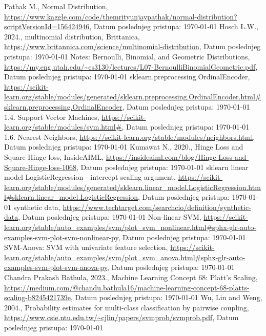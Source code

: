 \documentclass[fontsize=12bp, paper=a4]{scrarticle}
\begin{document}
\begin{thebibliography}{1}
    Pathak M., Normal Distribution, \url{https://www.kaggle.com/code/themrityunjaypathak/normal-distribution?scriptVersionId=156424946}, Datum poslednjeg pristupa: \today
    Hosch L.W., 2024., multinomial distribution, Brittanica, \url{https://www.britannica.com/science/multinomial-distribution}, Datum poslednjeg pristupa: \today
    Notes: Bernoulli, Binomial, and Geometric Distributions, \url{https://my.eng.utah.edu/~cs3130/lectures/L07-BernoulliBinomialGeometric.pdf}, Datum poslednjeg pristupa: \today
    sklearn.preprocessing.OrdinalEncoder, \url{https://scikit-learn.org/stable/modules/generated/sklearn.preprocessing.OrdinalEncoder.html#sklearn.preprocessing.OrdinalEncoder}, Datum poslednjeg pristupa: \today
    1.4. Support Vector Machines, \url{https://scikit-learn.org/stable/modules/svm.html#}, Datum poslednjeg pristupa: \today
    1.6. Nearest Neighbors, \url{https://scikit-learn.org/stable/modules/neighbors.html}, Datum poslednjeg pristupa: \today
    Kumawat N., 2020., Hinge Loss and Square Hinge loss,  InsideAIML, \url{https://insideaiml.com/blog/Hinge-Loss-and-Square-Hinge-loss-1068}, Datum poslednjeg pristupa: \today
    \textmd{sklearn linear model LogisticRegression - intercept scaling argument}, \url{https://scikit-learn.org/stable/modules/generated/sklearn.linear_model.LogisticRegression.html#sklearn.linear_model.LogisticRegression}, Datum poslednjeg pristupa: \today
    synthetic data, \url{https://www.techtarget.com/searchcio/definition/synthetic-data}, Datum poslednjeg pristupa: \today
    Non-linear SVM, \url{https://scikit-learn.org/stable/auto_examples/svm/plot_svm_nonlinear.html#sphx-glr-auto-examples-svm-plot-svm-nonlinear-py}, Datum poslednjeg pristupa: \today
    SVM-Anova: SVM with univariate feature selection,
    \url{https://scikit-learn.org/stable/auto_examples/svm/plot_svm_anova.html#sphx-glr-auto-examples-svm-plot-svm-anova-py}, Datum poslednjeg pristupa: \today
    Chandra Prakash Bathula, 2023., Machine Learning Concept 68: Platt’s Scaling, \url{https://medium.com/@chandu.bathula16/machine-learning-concept-68-platts-scaling-b8245421739e}, Datum poslednjeg pristupa: \today
    Wu, Lin and Weng, 2004., Probability estimates for multi-class classification by pairwise coupling, \url{https://www.csie.ntu.edu.tw/~cjlin/papers/svmprob/svmprob.pdf}, Datum poslednjeg pristupa: \today

\end{thebibliography}
\end{document}
